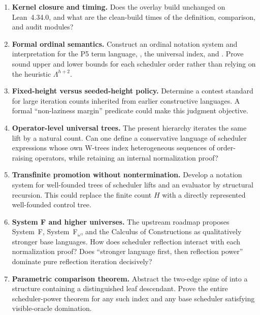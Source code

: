 \documentclass[11pt]{article}
\theoremstyle{definition}
\theoremstyle{remark}
\newcommand{\Height}{H}
\newcommand{\lean}[1]{\texttt{\detokenize{#1}}}
\begin{document}
\begin{enumerate}[leftmargin=*,label=\textbf{R\arabic*.}]
\item \textbf{Kernel closure and timing.} Does the overlay build unchanged on
      Lean~4.34.0, and what are the clean-build times of the definition,
      comparison, and audit modules?

\item \textbf{Formal ordinal semantics.} Construct an ordinal notation system
      and interpretation for the P5 term language, \lean{stage}, the universal
      index, and \lean{liftStage}.  Prove sound upper and lower bounds for each
      scheduler order rather than relying on the heuristic
      \(\Lambda^{h+2}\).

\item \textbf{Fixed-height versus seeded-height policy.} Determine a contest
      standard for large iteration counts inherited from earlier constructive
      languages.  A formal ``non-laziness margin'' predicate could make this
      judgment objective.

\item \textbf{Operator-level universal trees.} The present hierarchy iterates
      the same lift by a natural count.  Can one define a conservative language
      of scheduler expressions whose own W-trees index heterogeneous sequences
      of order-raising operators, while retaining an internal normalization
      proof?

\item \textbf{Transfinite promotion without nontermination.} Develop a notation
      system for well-founded trees of scheduler lifts and an evaluator by
      structural recursion.  This could replace the finite count \(\Height\)
      with a directly represented well-founded control tree.

\item \textbf{System F and higher universes.} The upstream roadmap proposes
      System~F, System~F$_\omega$, and the Calculus of Constructions as
      qualitatively stronger base languages.  How does scheduler reflection
      interact with each normalization proof?  Does ``stronger language first,
      then reflection power'' dominate pure reflection iteration decisively?

\item \textbf{Parametric comparison theorem.} Abstract the two-edge spine of
      \lean{index} into a structure containing a distinguished leaf descendant.
      Prove the entire scheduler-power theorem for any such index and any base
      scheduler satisfying visible-oracle domination.


\end{enumerate}
\end{document}
